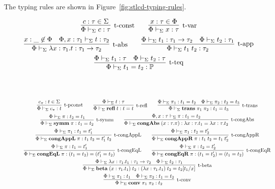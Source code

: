 \documentclass[10pt]{article}
\begin{document}
\begin{mydef}[Typing]\label{def:stlcd-typing-rules}
  The typing rules are shown in Figure~\ref{fig:stlcd-typing-rules}.
\end{mydef}


\begin{figure}[ht!]
\begin{gather*}  
\infer[\mbox{\typconst}]{
  \typeof{\Sigma}{\Phi}{c}{\tau}
}{
  c:\tau \in \Sigma
}
\qquad
\infer[\mbox{\typvar}]{
  \typeof{\Sigma}{\Phi}{x}{\tau}
}{
  x:\tau \in \Phi
}
\\
\infer[\mbox{\typabs}]{
  \typeof{\Sigma}{\Phi}{\tabs{x}{\tau_1}{t}}{\tau_1 \to \tau_2}
}{
  x:\_ \not\in\Phi 
  &
  \typeof{\Sigma}{\Phi,x:\tau_1}{t}{\tau_2}
}
\qquad
\infer[\mbox{\typapp}]{
  \typeof{\Sigma}{\Phi}{t_1\app t_2}{\tau_2}
}{
  \typeof{\Sigma}{\Phi}{t_1}{\tau_1 \to \tau_2}
  &
  \typeof{\Sigma}{\Phi}{t_2}{\tau_1}
}
\\
\infer[\mbox{\typteq}]{
  \typeof{\Sigma}{\Phi}{t_1 = t_2}{\prop}
}{
  \typeof{\Sigma}{\Phi}{t_1}{\tau}
  &
  \typeof{\Sigma}{\Phi}{t_2}{\tau}
}
\end{gather*}
\\
\\
\begin{gather*}
\infer[\mbox{\typpconst}]{
  \typeof{\Sigma}{\Phi}{c_\pi}{t}
}{
  c_\pi:t \in \Sigma
}
\qquad
\infer[\mbox{\typrefl}]{
  \typeof{\Sigma}{\Phi}{\refl t}{t = t}
}{
  \typeof{\Sigma}{\Phi}{t}{\tau}
}
\qquad
\infer[\mbox{\typtrans}]{
  \typeof{\Sigma}{\Phi}{\trans{\pi_1}{\pi_2}}{t_1 = t_3}
}{
  \typeof{\Sigma}{\Phi}{\pi_1}{t_1 = t_2}
  &
  \typeof{\Sigma}{\Phi}{\pi_2}{t_2 = t_3}
}
\\
\infer[\mbox{\typsymm}]{
  \typeof{\Sigma}{\Phi}{\symm{\pi}}{t_1 = t_2}
}{
  \typeof{\Sigma}{\Phi}{\pi}{t_2 = t_1}
}
\qquad
\infer[\mbox{\typcongabs}]{
  \typeof{\Sigma}{\Phi}{\congtabs{x}{\tau}{\pi}}{\tabs{x}{\tau}{t_1} = \tabs{x}{\tau}{t_2}}
}{
  \typeof{\Sigma}{\Phi,x:\tau}{\pi}{t_1 = t_2}
}
\\
\infer[\mbox{\typcongappl}]{
  \typeof{\Sigma}{\Phi}{\congappl{\pi}}{t_1\app t_2 = t_1'\app t_2}
}{
  \typeof{\Sigma}{\Phi}{\pi_1}{t_1 = t_1'}
}
\qquad
\infer[\mbox{\typcongappr}]{
  \typeof{\Sigma}{\Phi}{\congappr{\pi}}{t_1\app t_2 = t_1\app t_2'}
}{
  \typeof{\Sigma}{\Phi}{\pi_1}{t_2 = t_2'}
}
\\
\infer[\mbox{\typcongeql}]{
  \typeof{\Sigma}{\Phi}{\congeql{\pi}}{(t_1 = t_2) = (t_1' = t_2)}
}{
  \typeof{\Sigma}{\Phi}{\pi}{t_1 = t_1'}
}
\qquad
\infer[\mbox{\typcongeqr}]{
  \typeof{\Sigma}{\Phi}{\congeqr{\pi}}{(t_1 = t_2') = (t_1 = t_2)}
}{
  \typeof{\Sigma}{\Phi}{\pi}{t_2 = t_2'}
}
\\
\infer[\mbox{\typbeta}]{
  \typeof{\Sigma}{\Phi}{\tbetaconv{x}{\tau_1}{t_1}{t_2}}{(\tabs{x}{\tau_1}{t_1})\app t_2 = t_2[t_1/x]}
}{
  \typeof{\Sigma}{\Phi}{\tabs{x}{\tau_1}{t_1}}{\tau_1 \to \tau_2}
  &
  \typeof{\Sigma}{\Phi}{t_2}{\tau_1}
}
\\
\infer[\mbox{\typconv}]{
  \typeof{\Sigma}{\Phi}{\conv{\pi_1}{\pi_2}}{t_2}
}{
  \typeof{\Sigma}{\Phi}{\pi_1}{t_1}
  &
  \typeof{\Sigma}{\Phi}{\pi_2}{t_1 = t_2}
}
\end{gather*}  
  

\end{figure}
\end{document}
